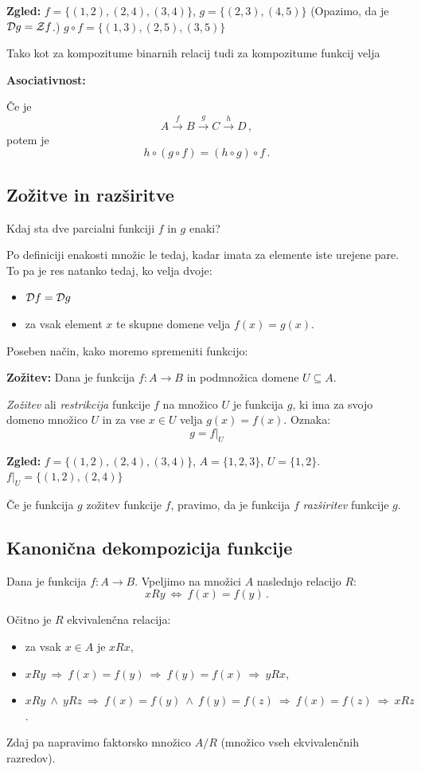 \documentclass[11pt,paper=b5,footinclude,headinclude]{scrbook} %
\def\inn {{~\wedge~}}
\def\sledi {{~\Rightarrow~}}
\def\cee {{~\Leftrightarrow~}}
\begin{document}
\bigskip
\textbf{ Zgled:} $f = \{(1,2),(2,4),(3,4)\}$, $g = \{(2,3),(4,5)\}$
(Opazimo, da je ${\cal D}g = {\cal Z}f$.)
$g\circ f = \{(1,3),(2,5), (3,5)\}$

\bigskip
Tako kot za kompozitume binarnih relacij tudi za kompozitume funkcij velja

\medskip
\textbf{ Asociativnost:}

Če je
$$A\overset{f}{\to} B\overset{g}{\to} C\overset{h}{\to} D\,,$$
potem je
$$h\circ (g\circ f) = (h\circ g)\circ f\,.$$

\subsection{Zožitve in razširitve}
Kdaj sta dve parcialni funkciji $f$ in $g$ enaki?

Po definiciji enakosti množic le tedaj, kadar imata za elemente iste urejene pare. To pa je res natanko tedaj, ko velja dvoje:
\begin{itemize}
  \item ${\cal D}f = {\cal D}g$
  \item za vsak element $x$ te skupne domene velja $f(x) = g(x)$.
\end{itemize}

Poseben način, kako moremo spremeniti funkcijo:

\medskip
\textbf{ Zožitev:}
Dana je funkcija $f:A\to B$ in podmnožica domene $U\subseteq A$.

{\em Zožitev} ali {\em restrikcija} funkcije $f$ na množico $U$
je funkcija $g$, ki ima za svojo domeno množico $U$ in za vse $x\in U$ velja
$g(x) = f(x)$. Oznaka:
$$g = f|_{U}$$

\bigskip
\textbf{ Zgled:} $f = \{(1,2),(2,4),(3,4)\}$, $A = \{1,2,3\}$, $U =  \{1,2\}$.
$f|_U = \{(1,2),(2,4)\}$

\bigskip
Če je funkcija $g$ zožitev funkcije $f$, pravimo, da je funkcija $f$ {\em razširitev} funkcije $g$.

\subsection{Kanonična dekompozicija funkcije}

Dana je funkcija $f:A{\to} B$.
Vpeljimo na množici $A$ naslednjo relacijo $R$:
$$xRy \cee f(x) = f(y)\,.$$

Očitno je $R$ ekvivalenčna relacija:
\begin{itemize}
  \item za vsak $x\in A$ je $xRx$,
  \item $xRy \sledi f(x) = f(y) \sledi f(y) = f(x) \sledi yRx$,
  \item $xRy \inn yRz \sledi f(x) = f(y) \inn f(y) = f(z) \sledi f(x) = f(z) \sledi xRz$.
\end{itemize}
Zdaj pa napravimo faktorsko množico $A/R$ (množico vseh ekvivalenčnih razredov).
\end{document}
